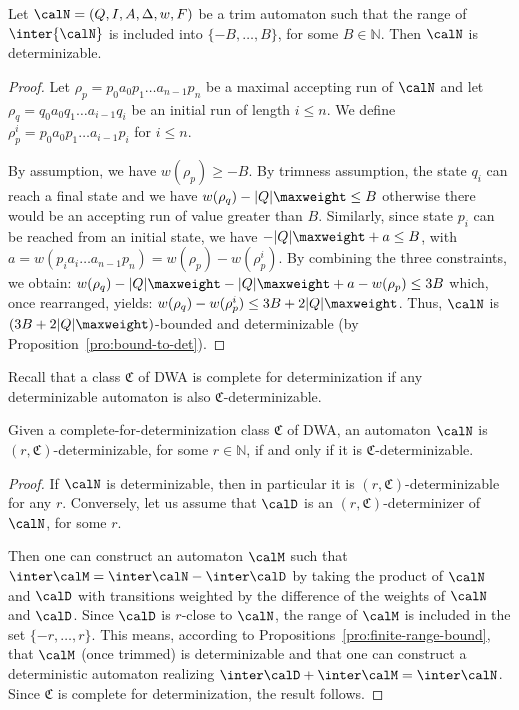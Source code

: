 \documentclass[a4paper]{article}
\begin{document}
\begin{proposition}\label{pro:finite-range-bound}
	Let $\calN = (Q,I,A,\Delta,w,F)$ be a trim automaton such that the range
	of $\inter{\calN}$ is included into $\{-B, \ldots, B\}$, for some $B \in
	\mathbb{N}$. Then $\calN$ is determinizable.
\end{proposition}

\begin{proof}
	Let $\rho_p = p_0 a_0 p_1 \dots a_{n-1} p_n$ be a maximal accepting run
	of $\calN$ and let $\rho_q = q_0 a_0 q_1 \dots a_{i-1} q_i$ be an
	initial run of length $i\leq n$.  We define $\rho_p^i = p_0 a_0 p_1
	\dots a_{i-1} p_i$ for $i\leq n$.

	By assumption, we have $w(\rho_p)\geq -B$.  By trimness assumption, the
	state $q_i$ can reach a final state and we have
	$w(\rho_q)-|Q|\maxweight\leq B$ otherwise there would be an accepting
	run of value greater than $B$.  Similarly, since state $p_i$ can be
	reached from an initial state, we have $-|Q|\maxweight +a \leq B$, with
	$a=w( p_i a_i \dots a_{n-1} p_n)=w(\rho_p)-w(\rho_p^i)$.  By combining
	the three constraints, we obtain: $w(\rho_q)-|Q|\maxweight
	-|Q|\maxweight +a -w(\rho_p)\leq 3B$ which, once rearranged, yields:
	$w(\rho_q) -w(\rho_p^i) \leq 3B + 2|Q|\maxweight$.  Thus, $\calN$ is
	$(3B + 2|Q|\maxweight)$-bounded and determinizable (by
	Proposition~\ref{pro:bound-to-det}).
\end{proof}

Recall that a class $\mathfrak{C}$ of DWA is complete for determinization if any
determinizable automaton is also $\mathfrak{C}$-determinizable.
\begin{theorem}\label{thm:rclose}
	Given a complete-for-determinization class $\mathfrak{C}$ of DWA, an
	automaton $\calN$ is $(r,\mathfrak{C})$-determinizable, for some $r \in
	\mathbb{N}$, if and only if it is $\mathfrak{C}$-determinizable.
\end{theorem}
\begin{proof}
	If $\calN$ is determinizable, then in particular it is
	$(r,\mathfrak{C})$-determinizable for any $r$.  Conversely, let us
	assume that $\calD$ is an $(r,\mathfrak{C})$-determinizer of
	$\calN$, for some $r$.

	Then one can construct an automaton $\calM$ such that $\inter \calM
	=\inter\calN -\inter\calD$ by taking the product of $\calN$ and $\calD$
	with transitions weighted by the difference of the weights of $\calN$
	and $\calD$. Since $\calD$ is $r$-close to $\calN$, the range of $\calM$
	is included in the set $\{ -r,\ldots ,r \}$.  This means, according to
	Propositions~\ref{pro:finite-range-bound},
	that $\calM$ (once trimmed) is
	determinizable and that one can construct a deterministic automaton
	realizing $\inter\calD +\inter\calM=\inter \calN$. Since
	$\mathfrak{C}$ is complete for determinization, the result follows.
\end{proof}
\end{document}
